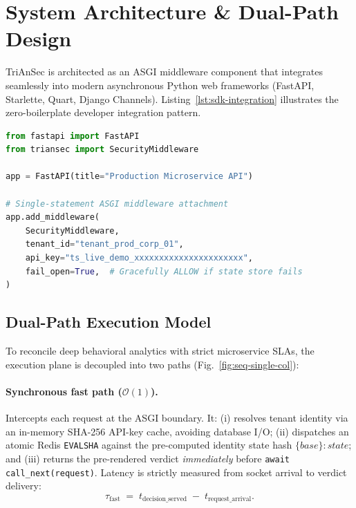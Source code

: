 \documentclass[journal,10pt]{IEEEtran}
\newcommand{\Tfast}{\tau_{\mathrm{fast}}}
\begin{document}
\section{System Architecture \& Dual-Path Design}
\label{sec:arch}

TriAnSec is architected as an ASGI middleware component that integrates seamlessly into modern asynchronous Python web frameworks (FastAPI, Starlette, Quart, Django Channels). Listing~\ref{lst:sdk-integration} illustrates the zero-boilerplate developer integration pattern.

\begin{lstlisting}[language=Python, caption={Minimal TriAnSec ASGI middleware integration interface.}, label={lst:sdk-integration}, basicstyle=\ttfamily\scriptsize]
from fastapi import FastAPI
from triansec import SecurityMiddleware

app = FastAPI(title="Production Microservice API")

# Single-statement ASGI middleware attachment
app.add_middleware(
    SecurityMiddleware,
    tenant_id="tenant_prod_corp_01",
    api_key="ts_live_demo_xxxxxxxxxxxxxxxxxxxxxx",
    fail_open=True,  # Gracefully ALLOW if state store fails
)
\end{lstlisting}

\subsection{Dual-Path Execution Model}
To reconcile deep behavioral analytics with strict microservice SLAs, the execution plane is decoupled into two paths (Fig.~\ref{fig:seq-single-col}):

\paragraph{Synchronous fast path ($\mathcal{O}(1)$).}
Intercepts each request at the ASGI boundary. It: (i) resolves tenant identity via an in-memory SHA-256 API-key cache, avoiding database I/O; (ii) dispatches an atomic Redis \texttt{EVALSHA} against the pre-computed identity state hash $\{base\}{:}state$; and (iii) returns the pre-rendered verdict \emph{immediately} before \texttt{await call\_next(request)}. Latency is strictly measured from socket arrival to verdict delivery:
\begin{equation}
\Tfast \;=\; t_{\mathrm{decision\_served}} \;-\; t_{\mathrm{request\_arrival}}.
\label{eq:tau}
\end{equation}
\end{document}

